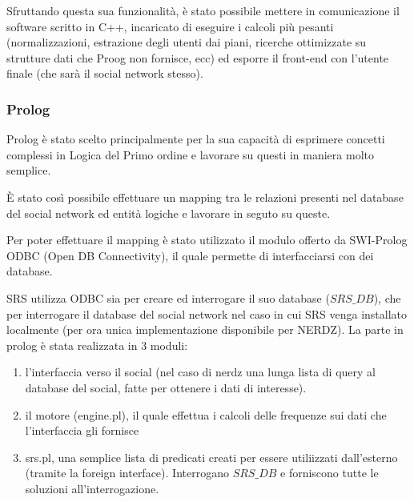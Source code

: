 {Sfruttando questa sua funzionalità, è stato possibile mettere in comunicazione il software scritto in C++, incaricato di eseguire i calcoli più pesanti (normalizzazioni, estrazione degli utenti dai piani, ricerche ottimizzate su strutture dati che Proog non fornisce, ecc) ed esporre il front-end con l'utente finale (che sarà il social network stesso).

\subsubsection{Prolog}
Prolog è stato scelto principalmente per la sua capacità di esprimere concetti complessi in Logica del Primo ordine e lavorare su questi in maniera molto semplice.

È stato così possibile effettuare un mapping tra le relazioni presenti nel database del social network ed entità logiche e lavorare in seguto su queste.

Per poter effettuare il mapping è stato utilizzato il modulo offerto da SWI-Prolog ODBC (Open DB Connectivity), il quale permette di interfacciarsi con dei database.

SRS utilizza ODBC sia per creare ed interrogare il suo database ($SRS\_DB$), che per interrogare il database del social network nel caso in cui SRS venga installato localmente (per ora unica implementazione disponibile per NERDZ).
\clearpage
La parte in prolog è stata realizzata in 3 moduli:
\begin{enumerate}
    \item l'interfaccia verso il social (nel caso di nerdz una lunga lista di query al database del social, fatte per ottenere i dati di interesse).
    \item il motore (engine.pl), il quale effettua i calcoli delle frequenze sui dati che l'interfaccia gli fornisce
    \item srs.pl, una semplice lista di predicati creati per essere utiliizzati dall'esterno (tramite la foreign interface). Interrogano $SRS\_DB$ e forniscono tutte le soluzioni all'interrogazione.
\end{enumerate}

}

